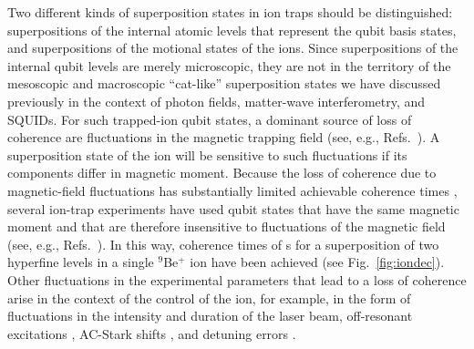 \documentclass[3p,sort&compress,12pt]{elsarticle}
\begin{document}
Two different kinds of superposition states in ion traps should be distinguished: superpositions of the internal atomic levels that represent the qubit basis states, and superpositions of the motional states of the ions. Since superpositions of the internal qubit levels are merely microscopic, they are not in the territory of the mesoscopic and macroscopic ``cat-like'' superposition states we have discussed previously in the context of photon fields, matter-wave interferometry, and SQUIDs. For such trapped-ion qubit states, a dominant source of loss of coherence are fluctuations in the magnetic trapping field (see, e.g., Refs.~\cite{SchmidtKaler:2003:pp,Brouard:2004:in,Grotz:2006:km, Haffner:2008:pp}). A superposition state of the ion will be sensitive to such fluctuations if its components differ in magnetic moment. Because the loss of coherence due to magnetic-field fluctuations has substantially limited achievable coherence times \cite{Haffner:2008:pp}, several ion-trap experiments have used qubit states that have the same magnetic moment and that are therefore insensitive to fluctuations of the magnetic field (see, e.g., Refs.~\cite{Haljan:2005:oo,Langer:2005:uu,Benhelm:2008:oo}). In this way, coherence times of \unit[10]{s} for a superposition of two hyperfine levels in a single $^9$Be$^+$ ion have been achieved \cite{Langer:2005:uu} (see Fig.~\ref{fig:iondec}). Other fluctuations in the experimental parameters that lead to a loss of coherence arise in the context of the control of the ion, for example, in the form of fluctuations in the intensity \cite{Schneider:1998:yz} and duration \cite{Miquel:1997:zz} of the laser beam, off-resonant excitations \cite{Steane:2000:ii}, AC-Stark shifts \cite{Haffner:2003:oo}, and detuning errors \cite{Leibfried:2003:mm}.
\end{document}
